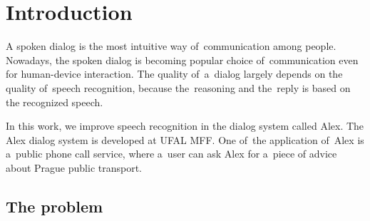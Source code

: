 \chapter{Introduction}
\label{chap:intro}

% 
% 
% 

A spoken dialog is the most intuitive way of~communication among people. Nowadays, the spoken dialog is becoming popular 
choice of~communication even for human-device interaction. The quality of~a~dialog largely depends on the quality 
of~speech recognition, because the~reasoning and the~reply is based on the recognized speech. 

In this work, we improve speech recognition in the dialog system called Alex. 
The Alex dialog system is developed at \ac{UFAL} \ac{MFF}. One of~the application of~Alex is a~public phone call service, where a~user can ask Alex for 
a~piece of advice about Prague public transport.

\section{The problem} 
\label{sec:why}

